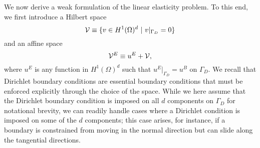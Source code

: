 We now derive a weak formulation of the linear elasticity problem.  To this end, we first introduce a Hilbert space
\begin{equation}
  \calV \equiv \{ v \in H^1(\Omega)^d \ | \ v|_{\Gamma_D} = 0 \}
  \label{eq:le_calV}
\end{equation}
and an affine space
\begin{equation*}
  \mathcal{V}^E \equiv u^E + \mathcal{V},
\end{equation*}
where $u^E$ is any function in $H^1(\Omega)^d$ such that $u^E|_{\Gamma_D} = u^B$ on $\Gamma_D$.  We recall that Dirichlet boundary conditions are essential boundary conditions that must be enforced explicitly through the choice of the space. While we here assume that the Dirichlet boundary condition is imposed on all $d$ components on $\Gamma_D$ for notational brevity, we can readily handle cases where a Dirichlet condition is imposed on some of the $d$ components; this case arises, for instance, if a boundary is constrained from moving in the normal direction but can slide along the tangential directions.  

